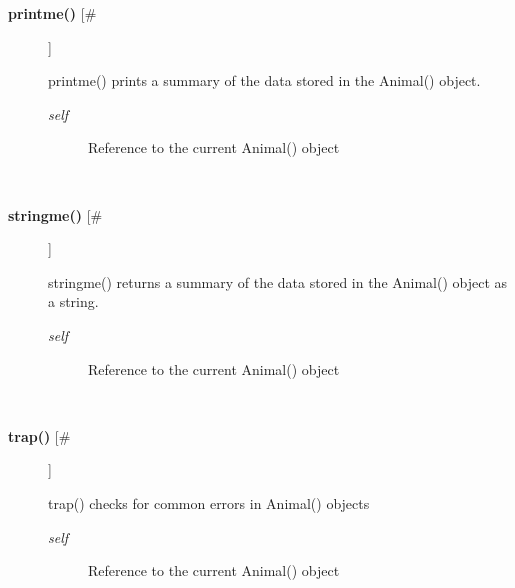 \documentclass{article}
\begin{document}
\begin{description}
\item[\textbf{printme()} [\#]
]
\par printme() prints a summary of the data stored in the Animal() object.
\begin{description}
\item[\textit{self}
]
Reference to the current Animal() object
\end{description}\\

\item[\textbf{stringme()} [\#]
]
\par stringme() returns a summary of the data stored in the Animal() object
as a string.
\begin{description}
\item[\textit{self}
]
Reference to the current Animal() object
\end{description}\\

\item[\textbf{trap()} [\#]
]
\par trap() checks for common errors in Animal() objects
\begin{description}
\item[\textit{self}
]
Reference to the current Animal() object
\end{description}\\

\end{description}
\end{document}
